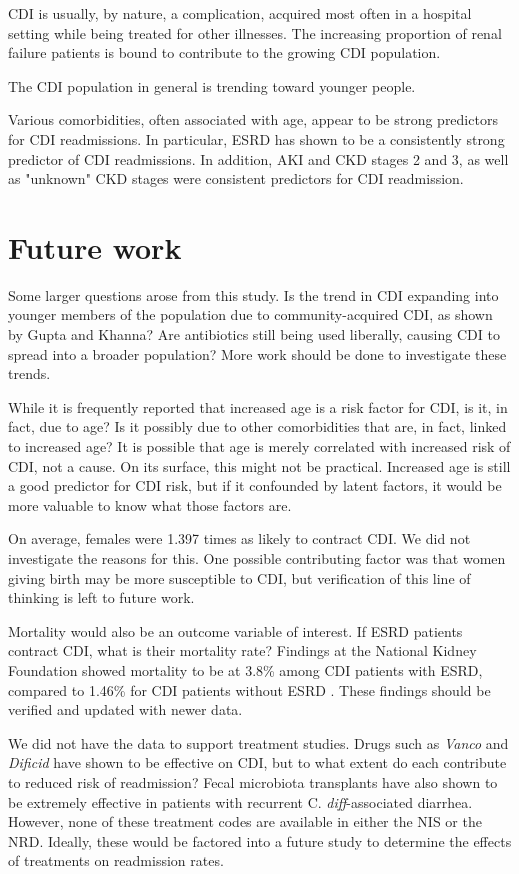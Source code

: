 \documentclass[12pt]{ociamthesis}\usepackage[]{graphicx}\usepackage[]{color}
\newcommand{\cdiff}{C. \textit{diff}}
\begin{document}
CDI is usually, by nature, a complication, acquired most often in a hospital
setting while being treated for other illnesses. The increasing proportion of 
renal failure patients is bound to contribute to the growing CDI population.

The CDI population in general is trending toward younger people. 

Various comorbidities, often associated with age, appear to be strong predictors
for CDI readmissions. In particular, ESRD has shown to be a consistently strong
predictor of CDI readmissions. In addition, AKI and CKD stages 2 and 3, as well as "unknown" CKD
stages were consistent predictors for CDI readmission. 


\section{Future work}

Some larger questions arose from this study. 
Is the trend in CDI expanding into younger members of the population due
to community-acquired CDI, as shown by Gupta and Khanna? \cite{Gupta2014} Are antibiotics
still being used liberally, causing CDI to spread into a broader population? More 
work should be done to investigate these trends.

While it is frequently reported that increased age is a risk factor for CDI, is it, in fact, 
due to age? Is it possibly due to other comorbidities that are, in fact, linked to increased age?
It is possible that age is merely correlated with increased risk of CDI, not a cause.
On its surface, this might not be practical. Increased age is still a good predictor for CDI risk, 
but if it confounded by latent factors, it would be more valuable to know what those factors are. 

On average, females were 1.397 
times as likely to contract CDI. We did not investigate the
reasons for this. One possible contributing factor was that women giving birth may be more susceptible to CDI, but 
verification of this line of thinking is left to future work.

Mortality would also be an outcome variable of interest. If ESRD patients contract CDI, what is their mortality rate?
Findings at the National Kidney Foundation showed mortality to be at 3.8\% among CDI patients with ESRD, compared to
1.46\% for CDI patients without ESRD \cite{Susman2013}. These findings should be verified and updated with newer data. 

We did not have the data to support treatment studies. Drugs such as \textit{Vanco} and \textit{Dificid} have shown to
be effective on CDI, but to what extent do each contribute to reduced risk of readmission? Fecal microbiota transplants
have also shown to be extremely effective in patients with recurrent \cdiff-associated diarrhea. However, none of these
treatment codes are available in either the NIS or the NRD. Ideally, these would be factored into a future study to
determine the effects of treatments on readmission rates. 
\end{document}
